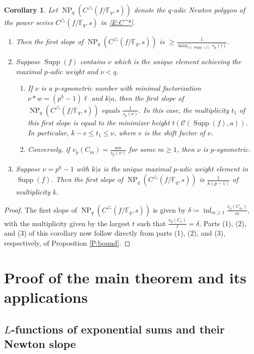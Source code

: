 \documentclass{amsart}
\numberwithin{equation}{section}
\newcommand{\F}{\mathbb{F}}
\newcommand{\cC}{\mathcal{C}}
\DeclareMathOperator{\NP}{NP}
\DeclareMathOperator{\Supp}{Supp}
\theoremstyle{plain}
\newtheorem{corollary}[theorem]{Corollary}
\theoremstyle{definition}
\begin{document}
\begin{corollary}
\label{C:slope}
Let $\NP_q(C^\triangle(f/\F_q,s))$
denote the $q$-adic Newton polygon of the power series 
$C^\triangle(f/\F_q,s)$ in \eqref{E:C^*}. 
\begin{enumerate}
\item Then the first slope of  $\NP_q(C^\triangle(f/\F_q,s))$ 
is $\ge \frac{1}{\max_{i\in\Supp(f)}s_p(i)}$.
\item 
Suppose $\Supp(f)$ contains $\nu$ which is the unique element achieving the maximal $p$-adic weight and $\nu<q$.
\begin{enumerate}
\item 
If $\nu$ is a $p$-symmetric number with minimal factorization $\nu* w=(p^k-1)\ell$
and $k|a$, then the first slope of $\NP_q(C^\triangle(f/\F_q,s))$ 
equals $\frac{1}{s_p(\nu)}$. 
In this case, the multiplicity $t_1$ of 
this first slope is equal to the minimizer height $t(\cC(\Supp(f),a))$.
In particular, $k-e\le t_1\le \nu$, where
 $e$ is the shift factor of $\nu$.
\item 
Conversely, if $v_p(C_m)=\frac{am}{s_p(\nu)}$ for some $m\ge 1$, then 
$\nu$ is $p$-symmetric.
\end{enumerate}
\item Suppose $\nu=p^k-1$ with $k|a$ is the unique maximal $p$-adic weight 
element in $\Supp(f)$. Then the first slope of $\NP_q(C^\triangle(f/\F_q,s))$ is $\frac{1}{k(p-1)}$ of multiplicity $k$.
\end{enumerate}
\end{corollary}
\begin{proof}
The first slope of $\NP_q(C^\triangle(f/\F_q, s))$ is given by
$\delta \coloneqq \inf_{m \ge 1} \frac{v_q(C_m)}{m}$,
with the multiplicity given by the largest $t$ such that $\frac{v_q(C_t)}{t} =
\delta$.
Parts (1), (2), and (3) of this corollary now follow directly from
parts (1), (2), and (3), respectively, of Proposition
\ref{P:bound}.
\end{proof}

\section{Proof of the main theorem and its applications}
\label{S:proof}

\subsection{\texorpdfstring{$L$}{L}-functions of exponential sums and their Newton slope}
\end{document}
